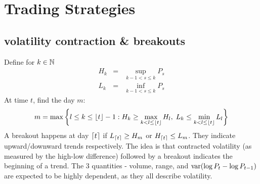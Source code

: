 \chapter{Trading Strategies}
\section{volatility contraction \& breakouts}
Define for $k \in \mathbb N$
\begin{eqnarray*}
  H_k &=&   \sup_{k-1 < s \leq k} P_s \\
  L_k &=&   \inf_{k-1 < s \leq k} P_s 
\end{eqnarray*}
At time $t$, find the day $m$:
\[
  m = \max\left\{l \leq k \leq \lfloor t\rfloor - 1:
  H_k \geq \max_{k < l \leq \lfloor t\rfloor} H_l,
  \;
  L_k \leq \min_{k < l \leq \lfloor t\rfloor} L_l
  \right\}
\]
A breakout happens at day $\lceil t\rceil$ if $L_{\lceil t\rceil} \geq H_m$ or
$H_{\lceil t\rceil} \leq L_m$. They indicate upward/downward trends
respectively.
The idea is that contracted volatility (as measured by the high-low
difference) followed by a breakout indicates the beginning of a trend.
The 3 quantities - volume, range, and $\text{var}(\log P_t - \log P_{t-1})$
are expected to be highly dependent, as they all describe volatility.


